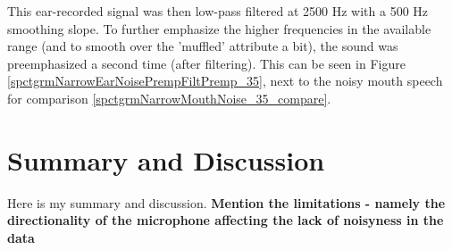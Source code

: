\documentclass[dissertation,copyright]{uathesis}
\begin{document}
This ear-recorded signal was then low-pass filtered at 2500 Hz with a 500 Hz smoothing slope. To further emphasize the higher frequencies in the available range (and to smooth over the 'muffled' attribute a bit), the sound was preemphasized a second time (after filtering).  This can be seen in Figure \ref{spctgrmNarrowEarNoisePrempFiltPremp_35}, next to the noisy mouth speech for comparison \ref{spctgrmNarrowMouthNoise_35_compare}.

\section{Summary and Discussion}
Here is my summary and discussion. \textbf{Mention the limitations - namely the directionality of the microphone affecting the lack of noisyness in the data}









\end{document}
